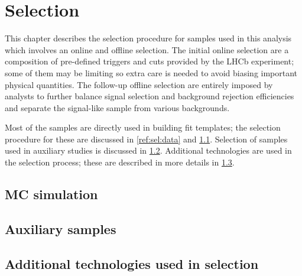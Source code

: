 \chapter{Selection}
\label{ref:sel}

This chapter describes the selection procedure for samples used in this
analysis which involves an online and offline selection.
The initial online selection are a composition of
pre-defined triggers and cuts provided by the LHCb experiment;
some of them may be limiting so extra care is needed to avoid biasing important
physical quantities.
The follow-up offline selection are entirely imposed by analysts
to further balance signal selection and background rejection efficiencies
and separate the signal-like sample from various backgrounds.

Most of the samples are directly used in building fit templates;
the selection procedure for these are discussed in \cref{ref:sel:data} and
\cref{ref:sel:mc}.
Selection of samples used in auxiliary studies is discussed in
\cref{ref:sel:aux-study}.
Additional technologies are used in the selection process;
these are described in more details in
\cref{ref:sel:tech}.





\section{MC simulation}
\label{ref:sel:mc}


\section{Auxiliary samples}
\label{ref:sel:aux-study}


\section{Additional technologies used in selection}
\label{ref:sel:tech}




